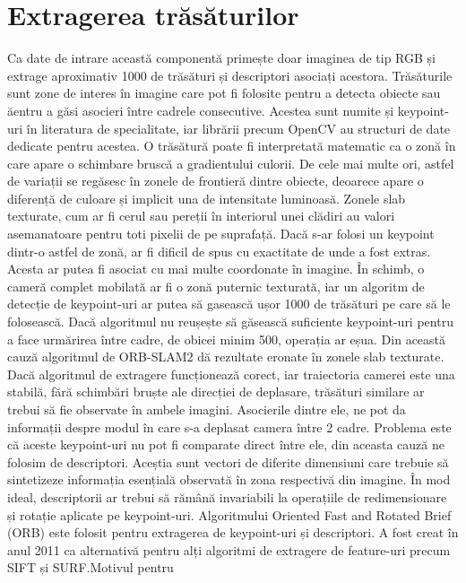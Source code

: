 \documentclass[12pt,a4paper]{report}
\begin{document}
\section{Extragerea trăsăturilor} 
Ca date de intrare această componentă primește doar imaginea de tip RGB și extrage
aproximativ 1000 de trăsături și descriptori asociați acestora. Trăsăturile sunt zone
de interes în imagine care pot fi folosite pentru a detecta obiecte sau ăentru a găsi asocieri 
între cadrele consecutive. Acestea sunt numite și keypoint-uri în literatura de 
specialitate, iar librării precum OpenCV au structuri de date dedicate pentru acestea.
O trăsătură poate fi interpretată matematic ca o zonă în care apare o schimbare 
bruscă a gradientului culorii. De cele mai multe ori, astfel de variații se regăsesc 
în zonele de frontieră dintre obiecte, deoarece apare o diferență
de culoare și implicit una de intensitate luminoasă. Zonele slab texturate, cum ar 
fi cerul sau pereții în interiorul unei clădiri au valori asemanatoare pentru
toti pixelii de pe suprafață. Dacă s-ar folosi un keypoint dintr-o astfel de zonă, 
ar fi dificil de spus cu exactitate de unde a fost extras. Acesta ar putea fi asociat cu 
mai multe coordonate în imagine. În schimb, o cameră 
complet mobilată ar fi o zonă puternic texturată, iar un algoritm de detecție de 
keypoint-uri ar putea să gasească ușor 1000 de trăsături pe care să le folosească.
Dacă algoritmul nu reușește să găsească suficiente keypoint-uri pentru a face urmărirea
între cadre, de obicei minim 500, operația ar eșua. Din această
cauză algoritmul de ORB-SLAM2 dă rezultate eronate în zonele slab texturate. Dacă algoritmul
de extragere funcționează corect, iar traiectoria camerei este una stabilă, fără schimbări
bruște ale direcției de deplasare, trăsături similare ar trebui să fie observate în ambele
imagini. Asocierile dintre ele, ne pot da informații despre modul în care s-a deplasat 
camera între 2 cadre. Problema este că aceste keypoint-uri nu pot fi comparate direct
între ele, din aceasta cauză ne folosim de descriptori. Aceștia sunt vectori de diferite 
dimensiuni care trebuie să sintetizeze informația esențială observată în zona respectivă din
imagine. În mod ideal, descriptorii ar trebui să rămână invariabili la operațiile de 
redimensionare și rotație aplicate pe keypoint-uri. 
Algoritmului Oriented Fast and Rotated Brief (ORB)\cite{Rublee2011ORBAE} este folosit
pentru extragerea de 
keypoint-uri și descriptori. A fost creat în anul 2011 ca alternativă pentru alți algoritmi
de extragere de feature-uri precum SIFT\cite{sift} și SURF\cite{bay2006surf}.\@ Motivul pentru
\end{document}
